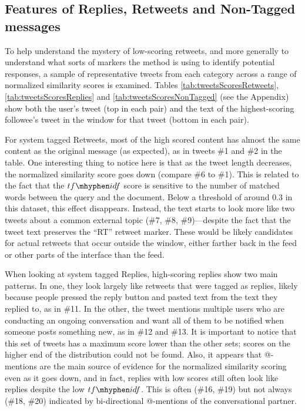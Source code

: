 \subsection{Features of Replies, Retweets and Non-Tagged messages}

To help understand the mystery of low-scoring retweets, and more generally to understand what sorts of markers the method is using to identify potential responses, a sample of representative tweets from each category across a range of normalized similarity scores is examined.  
Tables \ref{tab:tweetsScoresRetweets}, \ref{tab:tweetsScoresReplies} and \ref{tab:tweetsScoresNonTagged} (see the Appendix) show both the user's tweet (top in each pair) and the text of the highest-scoring followee's tweet in the window for that tweet (bottom in each pair).

For system tagged Retweets, most of the high scored content has almost the same content as the original message (as expected), as in tweets \#1 and \#2 in the table.  One interesting thing to notice here is that as the tweet length decreases, the normalized similarity score goes down (compare \#6 to \#1). This is related to the fact that the $tf\mhyphen idf$ score is sensitive to the number of matched words between the query and the document.  
Below a threshold of around $0.3$ in this dataset, this effect disappears.  Instead, the text starts to look more like 
two tweets about a common external topic (\#7, \#8, \#9)---despite the fact that the tweet text preserves the ``RT'' retweet marker.  These would be likely candidates for actual retweets that occur outside the window, either farther back in the feed or other parts of the interface than the feed.

When looking at system tagged Replies, high-scoring replies show two main patterns.  In one, they look largely like retweets that were tagged as replies, likely because people pressed the reply button and pasted text from the text they replied to, as in \#11.  In the other, the tweet mentions multiple users who are conducting an ongoing conversation and want all of them to be notified when someone posts something new, as in \#12 and \#13.  It is important to notice that this set of tweets has a maximum score lower than the other sets; scores on the higher end of the distribution could not be found. Also, it appears that @-mentions are the main source of evidence for the normalized similarity scoring even as it goes down, and in fact, replies with low scores still often look like replies despite the low $tf\mhyphen idf$.  This is often (\#16, \#19) but not always (\#18, \#20) indicated by bi-directional @-mentions of the conversational partner.

